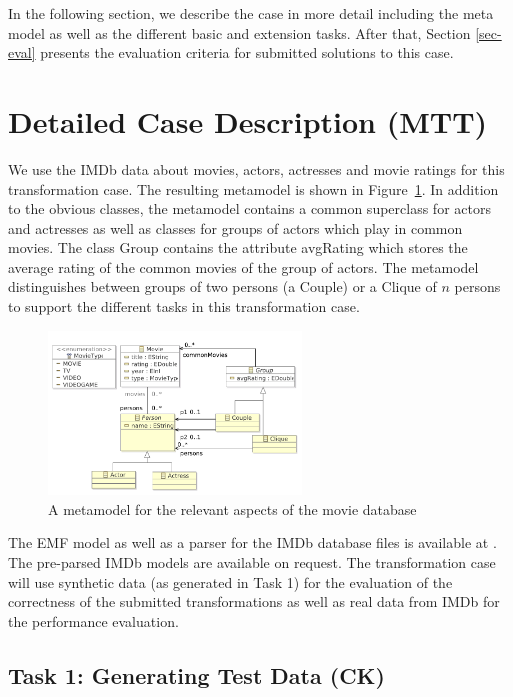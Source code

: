\documentclass[a4paper,11pt]{article}
\newcommand{\p}[1]{\textsf{\small #1}}
\begin{document}
In the following section, we describe the case in more detail
including the meta model as well as the different basic and extension
tasks. After that, Section \ref{sec-eval} presents the evaluation
criteria for submitted solutions to this case.


\section{Detailed Case Description (MTT)}\label{sec-case}

We use the IMDb data about movies, actors, actresses and movie ratings for this
transformation case. The resulting metamodel is shown in
Figure~\ref{fig:metamodel}. In addition to the obvious classes, the metamodel
contains a common superclass for actors and actresses as well as classes for
groups of actors which play in common movies. The class \p{Group} contains the
attribute \p{avgRating} which stores the average rating of the common movies of
the group of actors. The metamodel distinguishes between groups of two persons
(a \p{Couple}) or a \p{Clique} of $n$ persons to support the different
tasks in this transformation case.  

\begin{figure}[ht]
\centering
\includegraphics[width=0.6\textwidth]{movies}
\caption{A metamodel for the relevant aspects of the movie database}
\label{fig:metamodel}
\end{figure}

The EMF model as well as a parser for the
IMDb database files is available at \cite{IMDB2EMF}. The pre-parsed
IMDb models are available on request. The transformation case will use
synthetic data (as generated in Task 1) for the evaluation of
the correctness of the submitted transformations as well as real data
from IMDb for the performance evaluation.


\subsection{Task 1: Generating Test Data (CK)}
\label{sec:gen-test-data}
\end{document}
